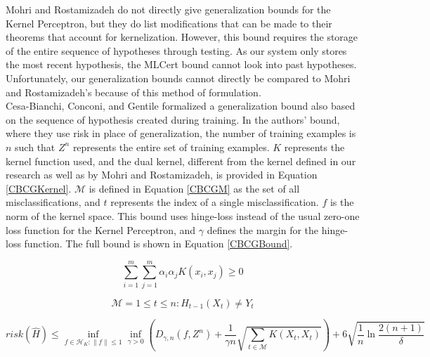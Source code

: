 Mohri and Rostamizadeh do not directly give generalization bounds for the Kernel Perceptron, but they do list modifications that can be made to their theorems that account for kernelization. However, this bound requires the storage of the entire sequence of hypotheses through testing. As our system only stores the most recent hypothesis, the MLCert bound cannot look into past hypotheses. Unfortunately, our generalization bounds cannot directly be compared to Mohri and Rostamizadeh's because of this method of formulation.
\\Cesa-Bianchi, Conconi, and Gentile \cite{CBCG04} formalized a generalization bound also based on the sequence of hypothesis created during training. In the authors' bound, where they use risk in place of generalization, the number of training examples is $n$ such that $Z^n$ represents the entire set of training examples. $K$ represents the kernel function used, and the dual kernel, different from the kernel defined in our research as well as by Mohri and Rostamizadeh, is provided in Equation \ref{CBCGKernel}. $\mathcal{M}$ is defined in Equation \ref{CBCGM} as the set of all misclassifications, and $t$ represents the index of a single misclassification. $f$ is the norm of the kernel space. This bound uses hinge-loss instead of the usual zero-one loss function for the Kernel Perceptron, and $\gamma$ defines the margin for the hinge-loss function. The full bound is shown in Equation \ref{CBCGBound}.

\begin{equation}\label{CBCGKernel}
 \sum_{i=1}^{m}\sum_{j=1}^{m} \alpha_i \alpha_j K(x_i, x_j) \geq 0
\end{equation}

\begin{equation}\label{CBCGM}
 \mathcal{M} = {1 \leq t \leq n : H_{t-1}(X_t) \neq Y_t}
\end{equation}

\begin{equation}\label{CBCGBound}
 risk(\hat{H}) \leq \inf_{f\in \mathcal{H}_K:\|f\|\leq1} \inf_{\gamma > 0} \left(D_{\gamma,n}(f, Z^n) + \frac{1}{\gamma n} \sqrt{\sum_{t \in \mathcal{M}} K(X_t, X_t)}\right) + 6\sqrt{\frac{1}{n}\ln \frac{2(n+1)}{\delta}}
\end{equation}


